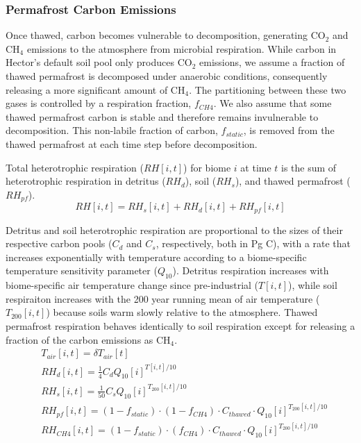 \documentclass[essd, manuscript]{copernicus}
\begin{document}
\subsubsection{Permafrost Carbon Emissions}
Once thawed, carbon becomes vulnerable to decomposition, generating CO$_2$ and CH$_4$ emissions to the atmosphere from microbial respiration. While carbon in Hector's default soil pool only produces CO$_2$ emissions, we assume a fraction of thawed permafrost is decomposed under anaerobic conditions, consequently releasing a more significant amount of CH$_4$. The partitioning between these two gases is controlled by a respiration fraction, $f_{CH4}$. We also assume that some thawed permafrost carbon is stable and therefore remains invulnerable to decomposition. This non-labile fraction of carbon, $f_{static}$, is removed from the thawed permafrost at each time step before decomposition. 

Total heterotrophic respiration ($RH[i,t]$) for biome $i$ at time $t$ is the sum of heterotrophic respiration in detritus ($RH_d$), soil ($RH_s$), and thawed permafrost ($RH_{pf}$).
\begin{equation} 
RH[i,t] = RH_s[i,t] + RH_d[i,t] + RH_{pf}[i,t]
\end{equation}

Detritus and soil heterotrophic respiration are proportional to the sizes of their respective carbon pools ($C_d$ and $C_s$, respectively, both in Pg C),
with a rate that increases exponentially with temperature according to a biome-specific temperature sensitivity parameter ($Q_{10}$).
Detritus respiration increases with biome-specific air temperature change since pre-industrial ($T[i,t]$),
while soil respiraiton increases with the 200 year running mean of air temperature ($T_{200}[i,t]$) because soils warm slowly relative to the atmosphere. Thawed permafrost respiration behaves identically to soil respiration except for releasing a fraction of the carbon emissions as CH$_4$.
\begin{align}
&T_{air}[i,t] = \delta T_{air}[t] \\
&RH_d[i,t] = \frac{1}{4} C_d Q_{10}[i] ^ {{T}[i,t] / 10} \\
&RH_s[i,t] = \frac{1}{50} C_s Q_{10}[i] ^ {T_{200}[i,t] / 10} \\
&RH_{pf}[i,t] = (1-f_{static})\cdot(1-f_{CH4})\cdot C_{thawed} \cdot Q_{10}[i] ^ {T_{200}[i,t] / 10} \\
&RH_{CH4}[i,t] = (1-f_{static})\cdot(f_{CH4})\cdot C_{thawed} \cdot Q_{10}[i] ^ {T_{200}[i,t] / 10}
\end{align}
\end{document}
